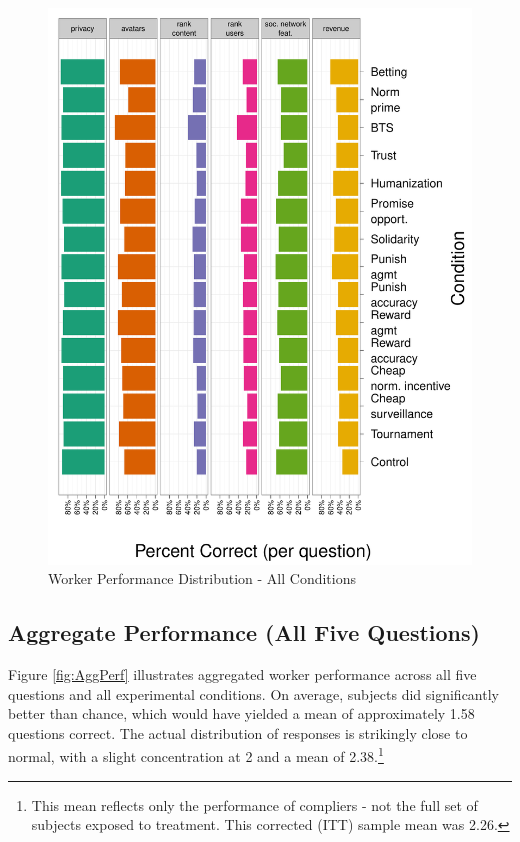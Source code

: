 \documentclass{cscw2010}
\begin{document}
\begin{figure} 
\centering 
\caption{Worker Performance Distribution - All Conditions \label{fig:per_q}}
\includegraphics[scale=.35]{../images/per_q}
\end{figure} 

\subsection{Aggregate Performance (All Five Questions)}

Figure \ref{fig:AggPerf} illustrates aggregated worker performance
across all five questions and all experimental conditions. On average,
subjects did significantly better than chance, which would have yielded
a mean of approximately 1.58 questions correct.  The actual
distribution of responses is strikingly close to normal, with a slight
concentration at 2 and a mean of 2.38.\footnote{This mean reflects
  only the performance of compliers - not the full set of subjects
  exposed to treatment. This corrected (ITT) sample mean was 2.26.}
\end{document}
